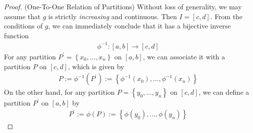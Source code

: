 \documentclass[thmcnt=section, 12pt]{my-elegantbook}
\begin{document}
\begin{proof}
    (One-To-One Relation of Partitions) Without loss of generality, we may assume that $g$ is strictly \textit{increasing} and continuous. Then $I = [c, d]$. From the conditions of $g$, we can immediately conclude that it has a bijective inverse function
    \begin{align*}
        \phi^{-1}: [a, b] \to [c, d]
    \end{align*}
    For any partition $P^\prime = \left\{x_0, \ldots, x_n\right\}$ on $[a, b]$, we can associate it with a partition $P$ on $[c, d]$, which is given by
    \begin{align*}
        P := \phi^{-1}(P^\prime)
        := \left\{\phi^{-1}(x_0), \ldots, \phi^{-1}(x_n)\right\}
    \end{align*}
    On the other hand, for any partition $P = \left\{y_0, \ldots, y_n\right\}$ on $[c, d]$, we can define a partition $P^\prime$ on $[a, b]$ by
    \begin{align*}
        P^\prime := \phi(P) := \left\{\phi(y_0), \ldots, \phi(y_n)\right\}
    \end{align*}


\end{proof}
\end{document}
